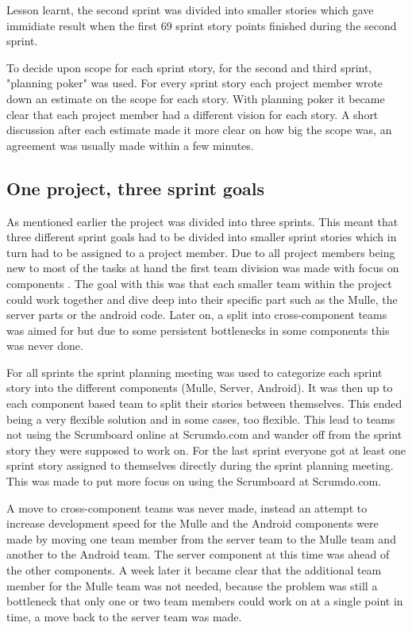 Lesson learnt, the second sprint was divided into smaller stories which gave immidiate result when the first 69 sprint story points finished during the second sprint.

To decide upon scope for each sprint story, for the second and third sprint, "planning poker" \cite[p.~42]{kniberg07} was used.
For every sprint story each project member wrote down an estimate on the scope for each story.
With planning poker it became clear that each project member had a different vision for each story.
A short discussion after each estimate made it more clear on how big the scope was, an agreement was usually made within a few minutes.

\subsection{One project, three sprint goals}
As mentioned earlier the project was divided into three sprints.
This meant that three different sprint goals had to be divided into smaller sprint stories which in turn had to be assigned to a project member.
Due to all project members being new to most of the tasks at hand the first team division was made with focus on components \cite[p.~106]{kniberg07}.
The goal with this was that each smaller team within the project could work together and dive deep into their specific part such as the Mulle, the server parts or the android code.
Later on, a split into cross-component teams \cite[p.~107]{kniberg07} was aimed for but due to some persistent bottlenecks in some components this was never done.

For all sprints the sprint planning meeting was used to categorize each sprint story into the different components (Mulle, Server, Android).
It was then up to each component based team to split their stories between themselves.
This ended being a very flexible solution and in some cases, too flexible. 
This lead to teams not using the Scrumboard online at Scrumdo.com and wander off from the sprint story they were supposed to work on.
For the last sprint everyone got at least one sprint story assigned to themselves directly during the sprint planning meeting.
This was made to put more focus on using the Scrumboard at Scrumdo.com.

A move to cross-component teams was never made, instead an attempt to increase development speed for the Mulle and the Android components were made by moving one team member from the server team to the Mulle team and another to the Android team.
The server component at this time was ahead of the other components.
A week later it became clear that the additional team member for the Mulle team was not needed, because the problem was still a bottleneck that only one or two team members could work on at a single point in time, a move back to the server team was made.


